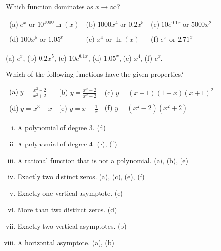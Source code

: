 \documentclass[11pt]{exam}
\newcommand{\rJustifyAnswer}[1]{\ifprintanswers\hfill #1\phantom{\hspace{2in}} \fi}
\begin{document}
\begin{questions}
  \question Which function dominates as $x \to \infty$?
\begin{table}[h]\centering
\begin{tabular}{lll}
(a) $e^x$ or $10^{1000} \ln(x)$	& (b) $1000x^4$ or $0.2x^5$	& (c) $10e^{0.1x}$ or $5000x^2$\\ \\
(d) $100x^5$ or $1.05^x$	& (e) $x^4$ or $\ln(x)$	& (f) $e^x$ or $2.71^x$
\end{tabular}
\end{table}
\begin{solution}
  (a) \(e^x\), (b) \(0.2x^5\), (c) \(10e^{0.1x}\), (d) \(1.05^x\), (e)
  \(x^4\), (f) \(e^x\).
\end{solution}
\vspace{-0.1in}
\question Which of the following functions have the given properties?
\begin{table}[h]\centering
\begin{tabular}{lll}
(a) $y = \frac{x^2-2}{x^2+2}$	& (b) $y = \frac{x^2+2}{x^2-2}$	& (c) $y = (x-1)(1-x)(x+1)^2$\\ \\
(d) $y = x^3-x$	& (e) $y = x-\frac{1}{x}$	& (f) $y = (x^2-2)(x^2+2)$
\end{tabular}
\end{table}
\vspace{-0.1in}
\begin{enumerate}[(i)]
	\item A polynomial of degree 3. \rJustifyAnswer{(d)}
	\item A polynomial of degree 4. \rJustifyAnswer{(c), (f)}
	\item A rational function that is not a
          polynomial. \rJustifyAnswer{(a), (b), (e)}
	\item Exactly two distinct zeros. \rJustifyAnswer{(a), (c),
            (e), (f)}
	\item Exactly one vertical asymptote. \rJustifyAnswer{(e)}
	\item More than two distinct zeros. \rJustifyAnswer{(d)}
	\item Exactly two vertical asymptotes. \rJustifyAnswer{(b)}
	\item A horizontal asymptote. \rJustifyAnswer{(a), (b)}
\end{enumerate}

\end{questions}
\end{document}
